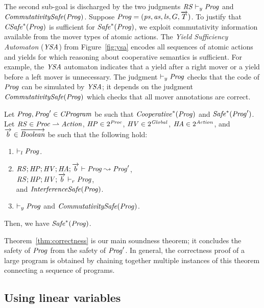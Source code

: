 The second sub-goal is discharged by the two judgments $\mathit{RS} \vdash_y \mathit{Prog}$ and $\mathit{CommutativitySafe}(\mathit{Prog})$.
Suppose $\mathit{Prog} = (\mathit{ps}, \mathit{as}, \mathit{ls}, G, \overrightarrow{T})$.
To justify that $\mathit{CSafe}^*(\mathit{Prog})$ is sufficient for $\mathit{Safe}^*(\mathit{Prog})$,
we exploit commutativity information available from the mover types of atomic actions.
The {\em Yield Sufficiency Automaton\/} ($\mathit{YSA}$) from Figure~\ref{fig:ysa} encodes 
all sequences of atomic actions and yields for which reasoning about cooperative semantics is sufficient.
For example, the $\mathit{YSA}$ automaton indicates that a yield after a right mover or a yield before a left mover is unnecessary.
The judgment $\vdash_y \mathit{Prog}$ checks that the code of $\mathit{Prog}$ can be simulated by $\mathit{YSA}$;
it depends on the judgment $\mathit{CommutativitySafe}(\mathit{Prog})$ which checks that all mover annotations are correct.

\begin{theorem}
\label{thm:correctness}
Let $\mathit{Prog},\mathit{Prog}' \in \mathit{CProgram}$ be such that $\mathit{Cooperative}^*(\mathit{Prog})$ and $\mathit{Safe}^*(\mathit{Prog}')$.
Let $\mathit{RS} \in \mathit{Proc} \rightharpoonup \mathit{Action}$, $\mathit{HP} \in 2^{\mathit{Proc}}$, 
$\mathit{HV} \in 2^{\mathit{Global}}$, $\mathit{HA} \in 2^{\mathit{Action}}$,
and $\overrightarrow{b} \in \overrightarrow{\mathit{Boolean}}$ be such that the following hold:
\begin{enumerate}
\item
$\vdash_l \mathit{Prog}$.
\item
$\mathit{RS};\mathit{HP};\mathit{HV};\mathit{HA};\overrightarrow{b} \vdash \mathit{Prog} \leadsto \mathit{Prog}'$,\\
$\mathit{RS};\mathit{HP};\mathit{HV};\overrightarrow{b} \vdash_r \mathit{Prog}$,\\ and $\mathit{InterferenceSafe}(\mathit{Prog})$.
\item
$\vdash_y \mathit{Prog}$ and $\mathit{CommutativitySafe}(\mathit{Prog})$.
\end{enumerate}
Then, we have $\mathit{Safe}^*(\mathit{Prog})$.
\end{theorem}

Theorem~\ref{thm:correctness} is our main soundness theorem;
it concludes the safety of $\mathit{Prog}$ from the safety of $\mathit{Prog}'$.
In general, the correctness proof of a large program is obtained by chaining together
multiple instances of this theorem connecting a sequence of programs.  

\subsection{Using linear variables}
\label{sec:linearity}

